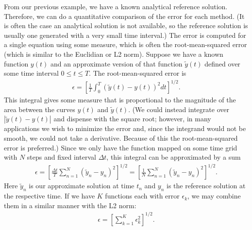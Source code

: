 From our previous example, we have a known analytical reference solution. Therefore, we can do a quantitative comparison of the error for each method. (It is often the case an analytical solution is not available, so the reference solution is usually one generated with a very small time interval.) The error is computed for a single equation using some measure, which is often the root-mean-squared error (which is similar to the Euclidian or L2 norm). Suppose we have a known function $y(t)$ and an approximate version of that function $\widetilde{y}(t)$ defined over some time interval $0 \le t \le T$. The root-mean-squared error is
\begin{align}
  \epsilon =  \left[ \frac{1}{T} \int_0^T ( \widetilde{y}(t) - y(t) )^2 dt \right]^{1/2} .
\end{align}
This integral gives some measure that is proportional to the magnitude of the area between the curves $y(t)$ and $\widetilde{y}(t)$. (We could instead integrate over $| \widetilde{y}(t) - y(t) |$ and dispense with the square root; however, in many applications we wish to minimize the error and, since the integrand would not be smooth, we could not take a derivative. Because of this the root-mean-squared error is preferred.) Since we only have the function mapped on some time grid with $N$ steps and fixed interval $\Delta t$, this integral can be approximated by a sum
\begin{align}
  \epsilon =  \left[ \frac{\Delta t}{T} \sum_{n=1}^N ( \widetilde{y}_n - y_n )^2 \right]^{1/2}
           = \left[ \frac{1}{N} \sum_{n=1}^N ( \widetilde{y}_n - y_n )^2 \right]^{1/2} .
\end{align}
Here $\widetilde{y}_n$ is our approximate solution at time $t_n$ and $y_n$ is the reference solution at the respective time. If we have $K$ functions each with error $\epsilon_k$, we may combine them in a similar manner with the L2 norm:
\begin{align}
  \epsilon = \left[ \sum_{k=1}^K \epsilon_k^2 \right]^{1/2}.
\end{align}

